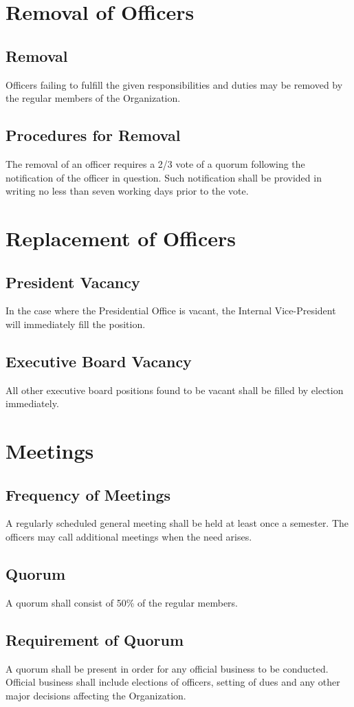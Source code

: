\documentclass{article}
\begin{document}
\section{Removal of Officers}
\subsection{Removal}
Officers failing to fulfill the given responsibilities and duties may be removed by the regular members of the Organization.
\subsection{Procedures for Removal}
The removal of an officer requires a 2/3 vote of a quorum following the
notification of the officer in question. Such notification shall be provided in
writing no less than seven working days prior to the vote.

\section{Replacement of Officers}
\subsection{President Vacancy}
In the case where the Presidential Office is vacant, the Internal Vice-President will immediately fill the position.
\subsection{Executive Board Vacancy}
All other executive board positions found to be vacant shall be filled by election immediately.

\section{Meetings}
\subsection{Frequency of Meetings}
A regularly scheduled general meeting shall be held at least once a semester. The officers may call additional meetings when the need arises.
\subsection{Quorum}
A quorum shall consist of 50\% of the regular members.
\subsection{Requirement of Quorum}
A quorum shall be present in order for any official business to be conducted.
Official business shall include elections of officers, setting of dues and any other major decisions affecting the Organization.
\end{document}
